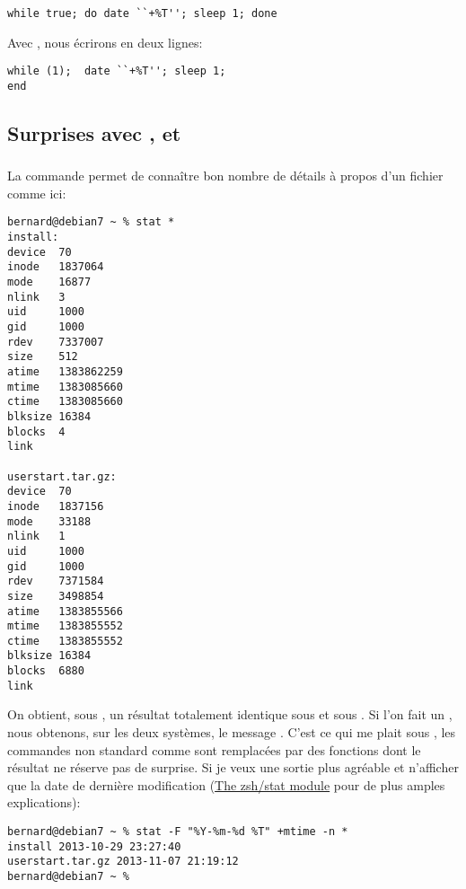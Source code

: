 \begin{lstlisting}
while true; do date ``+%T''; sleep 1; done
\end{lstlisting}

Avec \tcsh{}, nous écrirons en deux lignes:
\begin{lstlisting}
while (1);  date ``+%T''; sleep 1;
end
\end{lstlisting}

\subsection{Surprises avec ,  et }

\subsubsection{}
La commande  permet de connaître bon nombre de détails à propos d'un fichier comme ici:

\begin{lstlisting}
bernard@debian7 ~ % stat *
install:
device  70
inode   1837064
mode    16877
nlink   3
uid     1000
gid     1000
rdev    7337007
size    512
atime   1383862259
mtime   1383085660
ctime   1383085660
blksize 16384
blocks  4
link

userstart.tar.gz:
device  70
inode   1837156
mode    33188
nlink   1
uid     1000
gid     1000
rdev    7371584
size    3498854
atime   1383855566
mtime   1383855552
ctime   1383855552
blksize 16384
blocks  6880
link
\end{lstlisting}

On obtient, sous \zsh{}, un résultat totalement identique sous \netbsd{} et sous \linux{}.  Si l'on fait un , nous obtenons, sur les deux systèmes, le message . C'est ce qui me plait sous \zsh{}, les commandes non standard comme  sont remplacées par des fonctions dont le résultat ne réserve pas de surprise.  Si je veux une sortie plus agréable et n'afficher que la date de dernière modification (\cf \href{http://zsh.sourceforge.net/Doc/Release/Zsh-Modules.html#The-zsh_002fstat-Module}{The zsh/stat module} pour de plus amples explications):

\begin{lstlisting}
bernard@debian7 ~ % stat -F "%Y-%m-%d %T" +mtime -n *
install 2013-10-29 23:27:40
userstart.tar.gz 2013-11-07 21:19:12
bernard@debian7 ~ %
\end{lstlisting}

